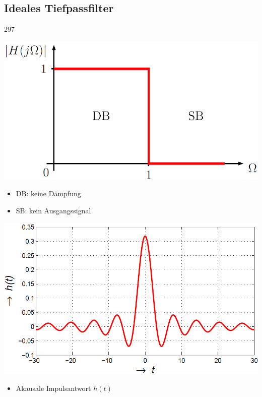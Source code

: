 \subsection{Ideales Tiefpassfilter}{297}

\begin{minipage}[c]{0.48\columnwidth}
    \includegraphics[width=\columnwidth]{images/filter_toleranzschema_idealer_tiefpass.png}

    \begin{itemize}
        \item DB: keine Dämpfung
        \item SB: kein Ausgangssignal
    \end{itemize}
\end{minipage}
\hfill
\begin{minipage}[c]{0.42\columnwidth}
    \includegraphics[width=\columnwidth]{images/filter_impulsantwort_idealer_tiefpass.png}
    
    \begin{itemize}
        \item Akausale Impulsantwort $h(t)$
    \end{itemize}
\end{minipage}

